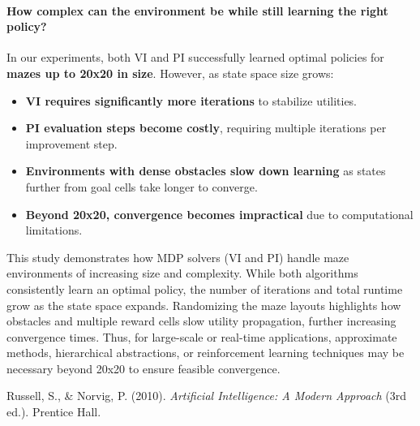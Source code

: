 \documentclass[11pt]{article}
\begin{document}
\paragraph{How complex can the environment be while still learning the right policy?} \leavevmode\newline
In our experiments, both VI and PI successfully learned optimal policies for \textbf{mazes up to 20x20 in size}. However, as state space size grows:
\begin{itemize}
    \item \textbf{VI requires significantly more iterations} to stabilize utilities.
    \item \textbf{PI evaluation steps become costly}, requiring multiple iterations per improvement step.
    \item \textbf{Environments with dense obstacles slow down learning} as states further from goal cells take longer to converge.
    \item \textbf{Beyond 20x20, convergence becomes impractical} due to computational limitations.
\end{itemize} 


\noindent This study demonstrates how MDP solvers (VI and PI) handle maze environments of increasing size and complexity. While both algorithms consistently learn an optimal policy, the number of iterations and total runtime grow as the state space expands. Randomizing the maze layouts highlights how obstacles and multiple reward cells slow utility propagation, further increasing convergence times. Thus, for large-scale or real-time applications, approximate methods, hierarchical abstractions, or reinforcement learning techniques may be necessary beyond 20x20 to ensure feasible convergence.

\begin{thebibliography}{9}
  Russell, S., \& Norvig, P. (2010). \emph{Artificial Intelligence: A Modern Approach} (3rd ed.). Prentice Hall.
\end{thebibliography}
\end{document}
